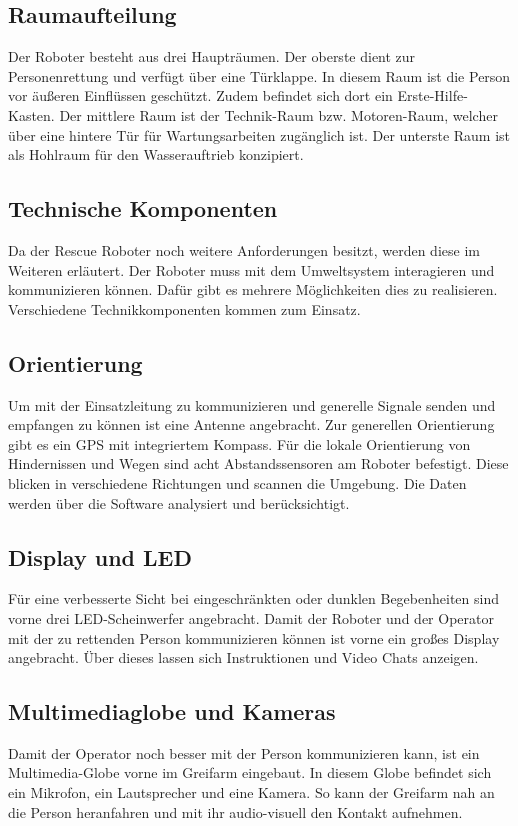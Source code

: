 \subsection{Raumaufteilung}
Der Roboter besteht aus drei Haupträumen. 
Der oberste dient zur Personenrettung und verfügt über eine Türklappe.
In diesem Raum ist die Person vor äußeren Einflüssen geschützt. Zudem befindet sich dort ein Erste-Hilfe-Kasten. 
Der mittlere Raum ist der Technik-Raum bzw. Motoren-Raum, welcher über eine hintere Tür für Wartungsarbeiten zugänglich ist. 
Der unterste Raum ist als Hohlraum für den Wasserauftrieb konzipiert.

\subsection {Technische Komponenten}
Da der Rescue Roboter noch weitere Anforderungen besitzt, werden diese im Weiteren erläutert. 
Der Roboter muss mit dem Umweltsystem interagieren und kommunizieren können.
Dafür gibt es mehrere Möglichkeiten dies zu realisieren. 
Verschiedene Technikkomponenten kommen zum Einsatz. 

\subsection {Orientierung}
Um mit der Einsatzleitung zu kommunizieren und generelle Signale senden und empfangen zu können ist eine Antenne angebracht. 
Zur generellen Orientierung gibt es ein GPS mit integriertem Kompass.
Für die lokale Orientierung von Hindernissen und Wegen sind acht Abstandssensoren am Roboter befestigt. 
Diese blicken in verschiedene Richtungen und scannen die Umgebung. 
Die Daten werden über die Software analysiert und berücksichtigt.

\subsection {Display und LED}
Für eine verbesserte Sicht bei eingeschränkten oder dunklen Begebenheiten sind vorne drei LED-Scheinwerfer angebracht. Damit der Roboter und der Operator mit der zu rettenden Person kommunizieren können ist vorne ein großes Display angebracht. Über dieses lassen sich Instruktionen und Video Chats anzeigen.

\subsection {Multimediaglobe und Kameras} 
Damit der Operator noch besser mit der Person kommunizieren kann, ist ein Multimedia-Globe vorne im Greifarm eingebaut.
In diesem Globe befindet sich ein Mikrofon, ein Lautsprecher und eine Kamera. 
So kann der Greifarm nah an die Person heranfahren und mit ihr audio-visuell den Kontakt aufnehmen.
 

